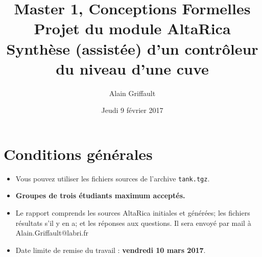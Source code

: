 \documentclass[a4paper]{article}
\newcommand{\altarica}{{\sc AltaRica}}
\begin{document}
\title{Master 1, Conceptions Formelles\\
Projet du module \altarica\\
Synthèse (assistée) d'un contrôleur du niveau d'une cuve}

\date{Jeudi 9 février 2017}

\author{Alain Griffault}

\maketitle



\section{Conditions générales}

\begin{itemize}
\item Vous pouvez utiliser les fichiers sources de l'archive {\tt tank.tgz}.
\item {\bf Groupes de trois étudiants maximum acceptés.}
\item Le rapport comprends les sources AltaRica initiales et générées; les fichiers résultats s'il y en a; et les réponses aux questions. Il sera envoyé par mail à Alain.Griffault@labri.fr
\item Date limite de remise du travail : {\bf vendredi 10 mars 2017}.
\end{itemize}
\end{document}
